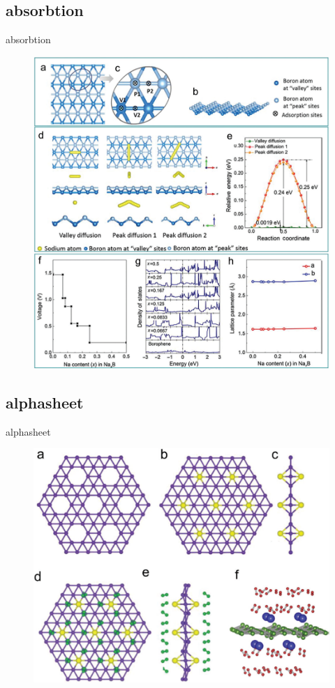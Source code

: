 \documentclass[handout,t]{beamer}
\begin{document}
\subsection{absorbtion}
\begin{frame}{absorbtion}
	\begin{figure}
		\centering
		\includegraphics[width=0.5\linewidth]{../figures/absorbtion.png}
		\label{fig:absorbtion}
	\end{figure}
\end{frame}
\subsection{alphasheet}
\begin{frame}{alphasheet}
	\begin{figure}
		\centering
		\includegraphics[width=0.5\linewidth]{../figures/alphasheet.png}
		\label{fig:alphasheet}
	\end{figure}
\end{frame}
\end{document}
